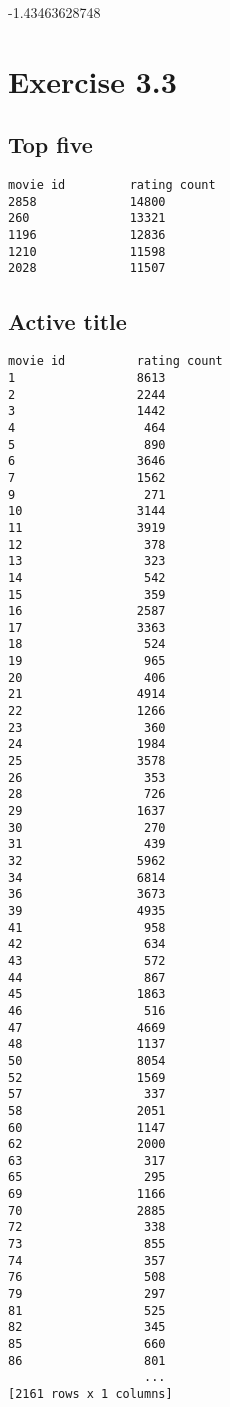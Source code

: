 \documentclass{article}
\begin{document}
-1.43463628748

\section{Exercise 3.3}

\subsection{Top five} 
     
\begin{verbatim}
movie id 		 rating count
2858             14800
260              13321
1196             12836
1210             11598
2028             11507
\end{verbatim}

\subsection{Active title}

\begin{verbatim}
movie id  		  rating count            
1                 8613
2                 2244
3                 1442
4                  464
5                  890
6                 3646
7                 1562
9                  271
10                3144
11                3919
12                 378
13                 323
14                 542
15                 359
16                2587
17                3363
18                 524
19                 965
20                 406
21                4914
22                1266
23                 360
24                1984
25                3578
26                 353
28                 726
29                1637
30                 270
31                 439
32                5962
34                6814
36                3673
39                4935
41                 958
42                 634
43                 572
44                 867
45                1863
46                 516
47                4669
48                1137
50                8054
52                1569
57                 337
58                2051
60                1147
62                2000
63                 317
65                 295
69                1166
70                2885
72                 338
73                 855
74                 357
76                 508
79                 297
81                 525
82                 345
85                 660
86                 801
                   ...
[2161 rows x 1 columns]
\end{verbatim}
\end{document}

